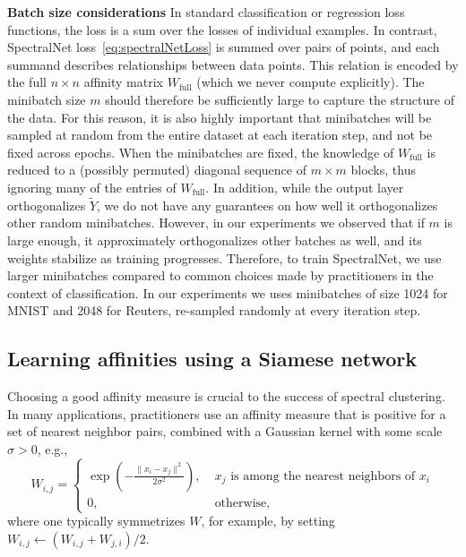 \documentclass{article} %
\begin{document}
\noindent \textbf{Batch size considerations} \quad
In standard classification or regression loss functions, the loss is a sum over the losses of individual examples.
In contrast, SpectralNet loss~\eqref{eq:spectralNetLoss} is summed over pairs of points, and each summand describes relationships between data points. This relation is encoded by the full $n \times n$ affinity matrix $W_\text{full}$ (which we never compute explicitly).
The minibatch size $m$ should therefore be sufficiently large to capture the structure of the data.
For this reason, it is also highly important that minibatches will be sampled at random from the entire dataset at each iteration step, and not be fixed across epochs. When the minibatches are fixed, the knowledge of $W_\text{full}$ is reduced to a (possibly permuted) diagonal sequence of $m \times m$ blocks, thus ignoring many of the entries of $W_\text{full}$.
In addition, while the output layer orthogonalizes $\tilde{Y}$, we do not have any guarantees on how well it orthogonalizes other random minibatches. However, in our experiments we observed that if $m$ is large enough, it approximately orthogonalizes other batches as well, and its weights stabilize as training progresses.
Therefore, to train SpectralNet, we use larger minibatches compared to common choices made by practitioners in the context of classification. In our experiments we uses minibatches of size 1024 for MNIST and 2048 for Reuters, re-sampled randomly at every iteration step.




\subsection {Learning affinities using a Siamese network}
\label{sec:siamese}

Choosing a good affinity measure is crucial to the success of spectral clustering.
In many applications, practitioners use an affinity measure that is positive for a set of nearest neighbor pairs, combined with a Gaussian kernel with some scale $\sigma > 0$, e.g.,
\begin{equation}
W_{i,j} = \begin{cases}
\exp\left(-\frac{\|x_i-x_j\|^2}{2\sigma^2}\right),\; &\text{$x_j$ is among the nearest neighbors of $x_i$}\\
0,\; &\text{otherwise,}
\end{cases}
\label{eq:gaussian}
\end{equation}
where one typically symmetrizes $W$, for example, by setting $W_{i,j}\leftarrow (W_{i,j}+W_{j,i})/2$.
\end{document}
